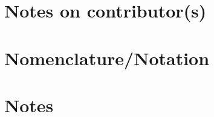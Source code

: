 \documentclass[]{interact}
\theoremstyle{plain}%
\theoremstyle{definition}
\theoremstyle{remark}
\begin{document}
\section*{Notes on contributor(s)}\label{notes-on-contributors}

\section*{Nomenclature/Notation}\label{nomenclaturenotation}

\section*{Notes}\label{notes}






\end{document}
